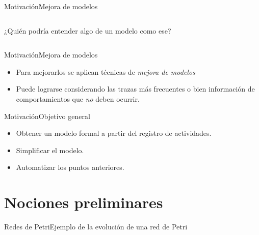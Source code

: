 \documentclass[spanish,pdf]{beamer}
\begin{document}
\begin{frame}{Motivación}{Mejora de modelos}
\begin{columns}
      ¿Quién podría entender algo de un modelo como ese?
  \end{columns}
\end{frame}

\begin{frame}{Motivación}{Mejora de modelos}
   \begin{itemize}
      \setlength\itemsep{0.4cm}
      \item<1-> Para mejorarlos se aplican técnicas de \textit{mejora de modelos}
      \item<2-> Puede lograrse considerando las trazas más frecuentes o bien información de comportamientos que \textit{no} deben ocurrir.
    \end{itemize}
\end{frame}

\begin{frame}{Motivación}{Objetivo general}
  \begin{itemize}
    \setlength\itemsep{0.4cm}

    \item<1-> Obtener un modelo formal a partir del registro de actividades.
    
    \item<2-> Simplificar el modelo.
    
    \item<3-> Automatizar los puntos anteriores.

  \end{itemize}
\end{frame}

\section{Nociones preliminares}

\begin{frame}{Redes de Petri}{Ejemplo de la evolución de una red de Petri}
  \begin{columns}
      \centering
      
  \end{columns}
\end{frame}
\end{document}
